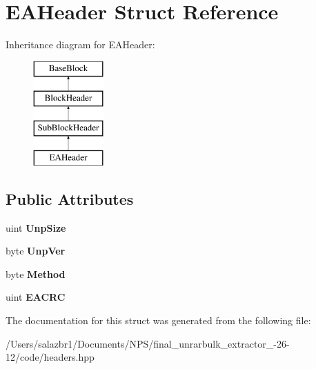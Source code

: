 \hypertarget{struct_e_a_header}{\section{E\-A\-Header Struct Reference}
\label{struct_e_a_header}
}
Inheritance diagram for E\-A\-Header\-:\begin{figure}[H]
\begin{center}
\leavevmode
\includegraphics[height=4.000000cm]{struct_e_a_header}
\end{center}
\end{figure}
\subsection*{Public Attributes}
\begin{DoxyCompactItemize}
\item 
\hypertarget{struct_e_a_header_a9d53720536c4f83e263f3a97bca23ed8}{uint {\bfseries Unp\-Size}}\label{struct_e_a_header_a9d53720536c4f83e263f3a97bca23ed8}

\item 
\hypertarget{struct_e_a_header_acc8d60390806f2b38eec17b6756e7114}{byte {\bfseries Unp\-Ver}}\label{struct_e_a_header_acc8d60390806f2b38eec17b6756e7114}

\item 
\hypertarget{struct_e_a_header_a1529ecbae7f5881e779645758675ebac}{byte {\bfseries Method}}\label{struct_e_a_header_a1529ecbae7f5881e779645758675ebac}

\item 
\hypertarget{struct_e_a_header_ab58cbf18b6ca3620ed8bd4196edc0769}{uint {\bfseries E\-A\-C\-R\-C}}\label{struct_e_a_header_ab58cbf18b6ca3620ed8bd4196edc0769}

\end{DoxyCompactItemize}


The documentation for this struct was generated from the following file\-:\begin{DoxyCompactItemize}
\item 
/\-Users/salazbr1/\-Documents/\-N\-P\-S/final\-\_\-unrarbulk\-\_\-extractor\-\_-\/26-\/12/code/headers.\-hpp\end{DoxyCompactItemize}
